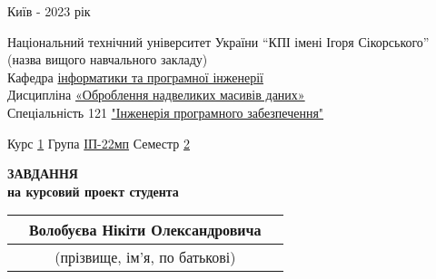 \documentclass[14pt]{article}
\begin{document}
\vspace*{\fill}
\begin{center}
Київ - 2023 рік
\end{center}

\thispagestyle{empty}

\pagebreak

\begin{center}
\fontsize{14}{17}\selectfont
Національний технічний університет України “КПІ імені Ігоря Сікорського”\\
\fontsize{12}{14}\selectfont
(назва вищого навчального закладу)\\
Кафедра \underline{інформатики та програмної інженерії}\\
Дисципліна \underline{«Оброблення надвеликих масивів даних»}\\
Спеціальність 121 \underline{"Інженерія програмного забезпечення"}\\
\end{center}
Курс \underline{\hspace{1em}1\hspace{1em}} Група \underline{\hspace{1em}ІП-22мп\hspace{1em}} \hfill Семестр \underline{\hspace{0.5em}2\hspace{0.5em}}\\

\fontsize{14}{17}\selectfont
\begin{center}
\textbf{ЗАВДАННЯ}\\
\textbf{на курсовий проект студента}\\

\begin{tabularx}{\textwidth}{X c X}
    & Волобуєва Нікіти Олександровича &\\
    \hline
    & \fontsize{9}{11}\selectfont (прізвище, ім’я, по батькові) &
\end{tabularx}
\end{center}
\end{document}
